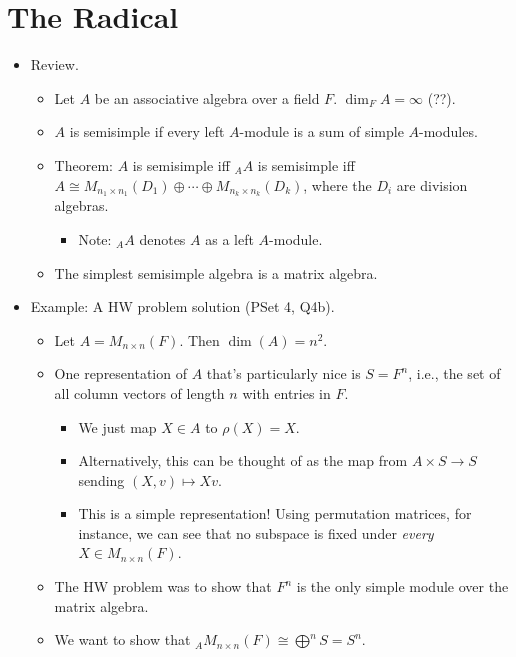 \documentclass[../notes.tex]{subfiles}
\begin{document}
\section{The Radical}
\begin{itemize}
    \item {}Review.
    \begin{itemize}
        \item Let $A$ be an associative algebra over a field $F$. $\dim_FA=\infty$ (??).
        \item $A$ is semisimple if every left $A$-module is a sum of simple $A$-modules.
        \item Theorem: $A$ is semisimple iff ${}_AA$ is semisimple iff $A\cong M_{n_1\times n_1}(D_1)\oplus\cdots\oplus M_{n_k\times n_k}(D_k)$, where the $D_i$ are division algebras.
        \begin{itemize}
            \item Note: ${}_AA$ denotes $A$ as a left $A$-module.
        \end{itemize}
        \item The simplest semisimple algebra is a matrix algebra.
    \end{itemize}
    \item Example: A HW problem solution (PSet 4, Q4b).
    \begin{itemize}
        \item Let $A=M_{n\times n}(F)$. Then $\dim(A)=n^2$.
        \item One representation of $A$ that's particularly nice is $S=F^n$, i.e., the set of all column vectors of length $n$ with entries in $F$.
        \begin{itemize}
            \item We just map $X\in A$ to $\rho(X)=X$.
            \item Alternatively, this can be thought of as the map from $A\times S\to S$ sending $(X,v)\mapsto Xv$.
            \item This is a simple representation! Using permutation matrices, for instance, we can see that no subspace is fixed under \emph{every} $X\in M_{n\times n}(F)$.
        \end{itemize}
        \item The HW problem was to show that $F^n$ is the only simple module over the matrix algebra.
        \item We want to show that ${}_AM_{n\times n}(F)\cong\bigoplus^nS=S^n$.
        \begin{itemize}

\end{itemize}
\end{itemize}
\end{itemize}
\end{document}
